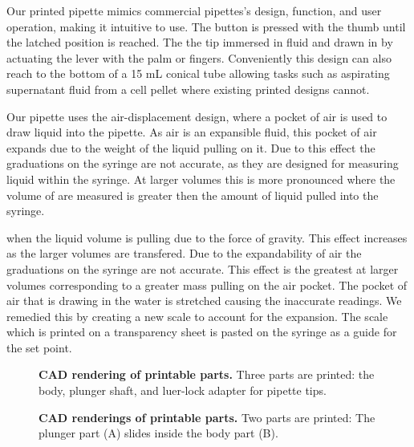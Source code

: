 \documentclass[10pt,letterpaper]{article}
\begin{document}
Our printed pipette mimics commercial pipettes's design, function, and user operation, making it intuitive to use.
The button is pressed with the thumb until the latched position is reached.
The the tip immersed in fluid and drawn in by actuating the lever with the palm or fingers.
Conveniently this design can also reach to the bottom of a 15 mL conical tube allowing tasks such as aspirating supernatant fluid from a cell pellet where existing printed designs cannot.

Our pipette uses the air-displacement design, where a pocket of air is used to draw liquid into the pipette.
As air is an expansible fluid, this pocket of air expands due to the weight of the liquid pulling on it.
Due to this effect the graduations on the syringe are not accurate, as they are designed for measuring liquid within the syringe.
At larger volumes this is more pronounced where the volume of are measured is greater then the amount of liquid pulled into the syringe.

when the liquid volume is pulling due to the force of gravity.
This effect increases as the larger volumes are transfered.
Due to the expandability of air the graduations on the syringe are not accurate.
This effect is the greatest at larger volumes corresponding to a greater mass pulling on the air pocket.
The pocket of air that is drawing in the water is stretched causing the inaccurate readings.
We remedied this by creating a new scale to account for the expansion.
The scale which is printed on a transparency sheet is pasted on the syringe as a guide for the set point.



\begin{figure}
\caption{
{\bf CAD rendering of printable parts.}  Three parts are printed: the body, plunger shaft, and luer-lock adapter for pipette tips.
}
\label{fig1}
\end{figure}

\begin{figure}
\caption{
{\bf CAD renderings of printable parts.} Two parts are printed: The plunger part (A) slides inside the body part (B).
}
\label{fig1}
\end{figure}
\end{document}
